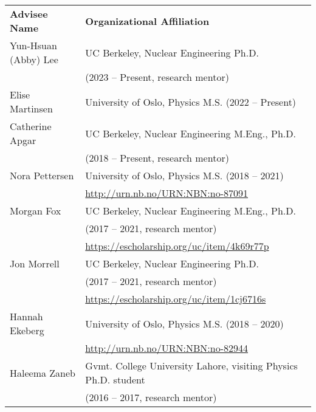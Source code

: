 \begin{longtable}{ @{} l @{\hspace{5ex}} l }
\bf{Advisee Name}   &  \bf{Organizational Affiliation}\\

Yun-Hsuan (Abby) Lee & UC Berkeley, Nuclear Engineering Ph.D. \\ & (2023 -- Present, research mentor)\\
Elise Martinsen & University of Oslo, Physics M.S. (2022 -- Present)\\
Catherine  Apgar & UC Berkeley, Nuclear Engineering M.Eng., Ph.D. \\ & (2018 -- Present, research mentor)\\
Nora Pettersen & University of Oslo, Physics M.S. (2018 -- 2021)\\
               & \url{http://urn.nb.no/URN:NBN:no-87091}\vspace{0.5mm}\\
Morgan  Fox & UC Berkeley, Nuclear Engineering M.Eng., Ph.D. \\ & (2017 -- 2021, research mentor)\\
                & \url{https://escholarship.org/uc/item/4k69r77p}\vspace{0.5mm}\\               
Jon  Morrell & UC Berkeley, Nuclear Engineering Ph.D. \\ & (2017 -- 2021, research mentor)\\
                & \url{https://escholarship.org/uc/item/1cj6716s}\vspace{0.5mm}\\
Hannah Ekeberg & University of Oslo, Physics M.S. (2018 -- 2020)\\
               & \url{http://urn.nb.no/URN:NBN:no-82944}\vspace{0.5mm}\\
Haleema Zaneb  & Gvmt. College University Lahore,
visiting Physics Ph.D. student\\
               &(2016 -- 2017, research mentor) \\

\end{longtable}
